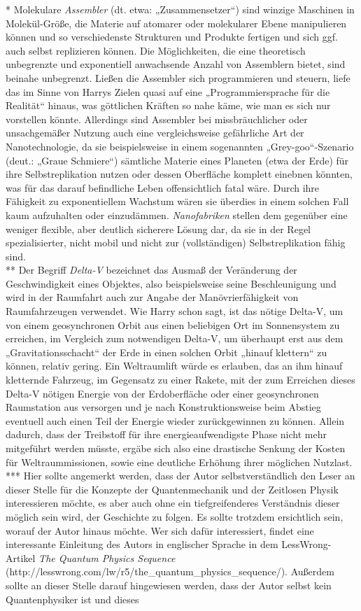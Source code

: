 {* Molekulare \emph{Assembler} (dt. etwa: „Zusammensetzer“) sind winzige Maschinen in Molekül-Größe, die Materie auf atomarer oder molekularer Ebene manipulieren können und so verschiedenste Strukturen und Produkte fertigen und sich ggf. auch selbst replizieren können. Die Möglichkeiten, die eine theoretisch unbegrenzte und exponentiell anwachsende Anzahl von Assemblern bietet, sind beinahe unbegrenzt. Ließen die Assembler sich programmieren und steuern, liefe das im Sinne von Harrys Zielen quasi auf eine „Programmiersprache für die Realität“ hinaus, was göttlichen Kräften so nahe käme, wie man es sich nur vorstellen könnte. Allerdings sind Assembler bei missbräuchlicher oder unsachgemäßer Nutzung auch eine vergleichsweise gefährliche Art der Nanotechnologie, da sie beispielsweise in einem sogenannten „Grey-goo“-Szenario (deut.: „Graue Schmiere“) sämtliche Materie eines Planeten (etwa der Erde) für ihre Selbstreplikation nutzen oder dessen Oberfläche komplett einebnen könnten, was für das darauf befindliche Leben offensichtlich fatal wäre. Durch ihre Fähigkeit zu exponentiellem Wachstum wären sie überdies in einem solchen Fall kaum aufzuhalten oder einzudämmen. \emph{Nanofabriken} stellen dem gegenüber eine weniger flexible, aber deutlich sicherere Lösung dar, da sie in der Regel spezialisierter, nicht mobil und nicht zur (vollständigen) Selbstreplikation fähig sind.\\ ** Der Begriff \emph{Delta-V} bezeichnet das Ausmaß der Veränderung der Geschwindigkeit eines Objektes, also beispielsweise seine Beschleunigung und wird in der Raumfahrt auch zur Angabe der Manövrierfähigkeit von Raumfahrzeugen verwendet. Wie Harry schon sagt, ist das nötige Delta-V, um von einem geosynchronen Orbit aus einen beliebigen Ort im Sonnensystem zu erreichen, im Vergleich zum notwendigen Delta-V, um überhaupt erst aus dem „Gravitationsschacht“ der Erde in einen solchen Orbit „hinauf klettern“ zu können, relativ gering. Ein Weltraumlift würde es erlauben, das an ihm hinauf kletternde Fahrzeug, im Gegensatz zu einer Rakete, mit der zum Erreichen dieses Delta-V nötigen Energie von der Erdoberfläche oder einer geosynchronen Raumstation aus versorgen und je nach Konstruktionsweise beim Abstieg eventuell auch einen Teil der Energie wieder zurückgewinnen zu können. Allein dadurch, dass der Treibstoff für ihre energieaufwendigste Phase nicht mehr mitgeführt werden müsste, ergäbe sich also eine drastische Senkung der Kosten für Weltraummissionen, sowie eine deutliche Erhöhung ihrer möglichen Nutzlast.\\ *** Hier sollte angemerkt werden, dass der Autor selbstverständlich den Leser an dieser Stelle für die Konzepte der Quantenmechanik und der Zeitlosen Physik interessieren möchte, es aber auch ohne ein tiefgreifenderes Verständnis dieser möglich sein wird, der Geschichte zu folgen. Es sollte trotzdem ersichtlich sein, worauf der Autor hinaus möchte. Wer sich dafür interessiert, findet eine interessante Einleitung des Autors in englischer Sprache in dem LessWrong-Artikel \emph{The Quantum Physics Sequence} (http://lesswrong.com/lw/r5/the\_quantum\_physics\_sequence/). Außerdem sollte an dieser Stelle darauf hingewiesen werden, dass der Autor selbst kein Quantenphysiker ist und dieses }
